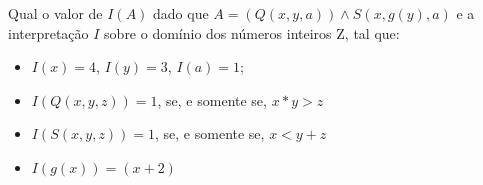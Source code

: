 
\question[10]

Qual o valor de $I(A)$ dado que $A=(Q(x, y, a)) \wedge S(x,g(y),a)$ e a interpretação $I$ sobre o domínio dos números inteiros Z, tal que:

\begin{itemize}
	\item $I(x)= 4$, $I(y) = 3$, $I(a) = 1$;
	\item $I(Q(x, y, z)) = 1$, se, e somente se, $x*y > z$ 
	\item $I(S(x, y, z)) = 1$, se, e somente se, $x < y +z$
	\item $I(g(x)) = (x + 2)$ 
\end{itemize}

\fillin[Verdadeiro][15cm]
